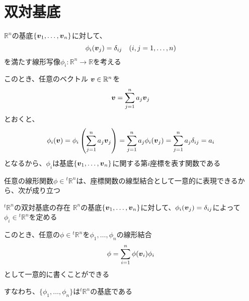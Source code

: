 \documentclass[../../../topic_linear-algebra]{subfiles}
\begin{document}
\sectionline
\section{双対基底}

$\mathbb{R}^n$の基底$\{ \vb*{v}_1,\ldots,\vb*{v}_n \}$に対して、
\begin{equation*}
  \phi_i(\vb*{v}_j) = \delta_{ij} \quad (i,j=1,\ldots,n)
\end{equation*}
を満たす線形写像$\phi_i:\mathbb{R}^n \to \mathbb{R}$を考える

\br

このとき、任意のベクトル $\vb*{v} \in \mathbb{R}^n$を
\begin{equation*}
  \vb*{v} = \sum_{j=1}^n a_j \vb*{v}_j
\end{equation*}
とおくと、
\begin{equation*}
  \phi_i(\vb*{v}) = \phi_i\left(\sum_{j=1}^{n} a_j \vb*{v}_j\right) = \sum_{j=1}^{n} a_j \phi_i(\vb*{v}_j) = \sum_{j=1}^{n} a_j \delta_{ij} = a_i
\end{equation*}
となるから、$\phi_i$は基底$\{ \vb*{v}_1,\ldots,\vb*{v}_n \}$に関する第$i$座標を表す関数である

\br

任意の線形関数$\phi \in {}^t\mathbb{R}^n$は、座標関数の線型結合として一意的に表現できるから、次が成り立つ

\begin{theorem}{${}^t\mathbb{R}^n$の双対基底の存在}\label{thm:dual-basis-existence-of-Rn}
  $\mathbb{R}^n$の基底$\{ \vb*{v}_1,\ldots,\vb*{v}_n \}$に対して、$\phi_i(\vb*{v}_j) = \delta_{ij}$によって$\phi_i \in {}^t\mathbb{R}^n$を定める

  このとき、任意の$\phi \in {}^t\mathbb{R}^n$を$\phi_1,\ldots,\phi_n$の線形結合
  \begin{equation*}
    \phi = \sum_{i=1}^{n} \phi(\vb*{v}_i) \phi_i
  \end{equation*}
  として一意的に書くことができる

  すなわち、$\{ \phi_1,\ldots,\phi_n \}$は${}^t \mathbb{R}^n$の基底である
\end{theorem}
\end{document}
